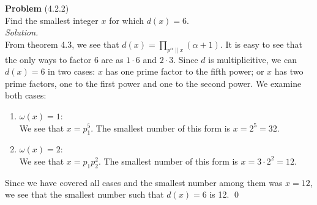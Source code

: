 \documentclass[12 pt]{amsart}
\begin{document}
\phantom{\quad} \vfill
\noindent
\textbf{Problem} (4.2.2) \\[4ex]
  Find the smallest integer $x$ for which $d(x) = 6$.
  \\[2ex]
\emph{Solution.} \\[2ex]
  From theorem 4.3, we see that
  $d(x) = \prod_{p^{\alpha} \parallel x} (\alpha + 1)$.
  It is easy to see that the only ways to factor 
  6 are as $1 \cdot 6$ and $2 \cdot 3$.
  Since $d$ is multiplicitive, we can $d(x) = 6$ in two cases:
  $x$ has one prime factor to the fifth power; 
  or $x$ has two prime factors, one to the first power and 
  one to the second power.
  We examine both cases:
  \begin{enumerate}
  \item $\omega(x) = 1$: \\
    We see that $x = p_1^5$.
    The smallest number of this form 
    is $x = 2^5 = 32$.
  \item $\omega(x) = 2$: \\
    We see that $x = p_1 p_2^2$.
    The smallest number of this form is
    $x = 3 \cdot 2^2 = 12$.
  \end{enumerate}
  Since we have covered all cases and the smallest number
  among them was $x = 12$, we see that the smallest
  number such that $d(x) = 6 $ is 12.
  \qed
\vfill
\newpage
\end{document}
